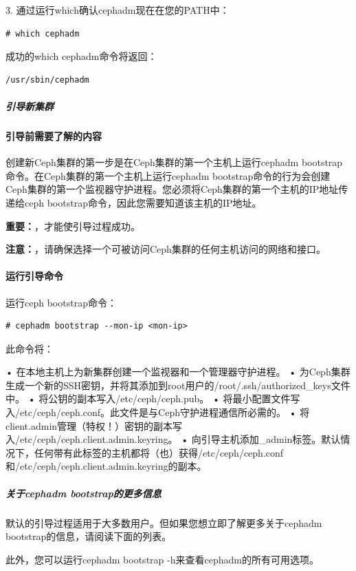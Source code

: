 \documentclass[12pt,UTF8]{ctexbook}
\begin{document}
3. 通过运行which确认cephadm现在在您的PATH中：
\begin{verbatim}
# which cephadm
\end{verbatim}

成功的which cephadm命令将返回：
\begin{verbatim}
/usr/sbin/cephadm
\end{verbatim}

\subparagraph{引导新集群}

\paragraph{引导前需要了解的内容}

创建新Ceph集群的第一步是在Ceph集群的第一个主机上运行cephadm bootstrap命令。在Ceph集群的第一个主机上运行cephadm bootstrap命令的行为会创建Ceph集群的第一个监视器守护进程。您必须将Ceph集群的第一个主机的IP地址传递给ceph bootstrap命令，因此您需要知道该主机的IP地址。

\textbf{重要：}，才能使引导过程成功。

\textbf{注意：}，请确保选择一个可被访问Ceph集群的任何主机访问的网络和接口。

\paragraph{运行引导命令}

运行ceph bootstrap命令：
\begin{verbatim}
# cephadm bootstrap --mon-ip <mon-ip>
\end{verbatim}

此命令将：

• 在本地主机上为新集群创建一个监视器和一个管理器守护进程。
• 为Ceph集群生成一个新的SSH密钥，并将其添加到root用户的/root/.ssh/authorized_keys文件中。
• 将公钥的副本写入/etc/ceph/ceph.pub。
• 将最小配置文件写入/etc/ceph/ceph.conf。此文件是与Ceph守护进程通信所必需的。
• 将client.admin管理（特权！）密钥的副本写入/etc/ceph/ceph.client.admin.keyring。
• 向引导主机添加_admin标签。默认情况下，任何带有此标签的主机都将（也）获得/etc/ceph/ceph.conf和/etc/ceph/ceph.client.admin.keyring的副本。

\subparagraph{关于cephadm bootstrap的更多信息}

默认的引导过程适用于大多数用户。但如果您想立即了解更多关于cephadm bootstrap的信息，请阅读下面的列表。

此外，您可以运行cephadm bootstrap -h来查看cephadm的所有可用选项。
\end{document}
